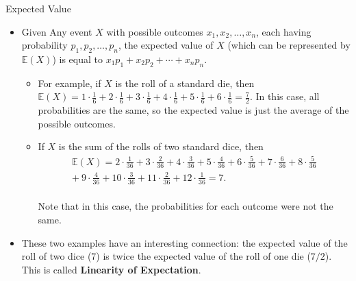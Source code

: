 \documentclass[9pt]{beamer}
\begin{document}
\begin{frame}[fragile, t]{Expected Value}
    \begin{itemize}
        \item Given Any event $X$ with possible outcomes $x_1,x_2,\ldots,x_n$, each having probability $p_1,p_2,\ldots,p_n$, the expected value of $X$ (which can be represented by $\mathbb{E}(X)$) is equal to $x_1p_1+x_2p_2+\cdots+x_np_n$.
        \begin{itemize}
            \item For example, if $X$ is the roll of a standard die, then $\mathbb{E}(X)=1\cdot\frac{1}{6}+2\cdot\frac{1}{6}+3\cdot\frac{1}{6}+4\cdot\frac{1}{6}+5\cdot\frac{1}{6}+6\cdot\frac{1}{6}=\frac{7}{2}$. In this case, all probabilities are the same, so the expected value is just the average of the possible outcomes.
            \item If $X$ is the sum of the rolls of two standard dice, then
            \begin{gather*}
                \mathbb{E}(X)=2\cdot\frac{1}{36}+3\cdot\frac{2}{36}+4\cdot\frac{3}{36}+5\cdot\frac{4}{36}+6\cdot\frac{5}{36}+7\cdot\frac{6}{36}+8\cdot\frac{5}{36} \\ +\ 9\cdot\frac{4}{36}+10\cdot\frac{3}{36}  +11\cdot\frac{2}{36}+12\cdot\frac{1}{36}=7.
            \end{gather*}\\
            Note that in this case, the probabilities for each outcome were not the same.
                
        \end{itemize}
        \item These two examples have an interesting connection: the expected value of the roll of two dice ($7$) is twice the expected value of the roll of one die ($7/2$). This is called \textbf{Linearity of Expectation}. 
        
    \end{itemize}
    
    
\end{frame}
\end{document}
